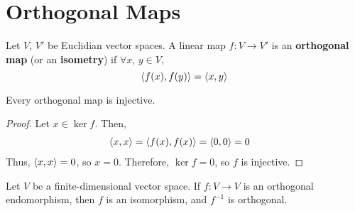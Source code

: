 \documentclass[letterpaper,12pt]{article}
\begin{document}
\section*{Orthogonal Maps}
\begin{definition}
Let $V$, $V'$ be Euclidian vector spaces. A linear map $f: V \rightarrow V'$ is an \textbf{orthogonal map} (or an \textbf{isometry}) if $\forall x$, $y \in V$,
\begin{equation*}
    \left< f(x), f(y) \right> = \left< x, y \right>
\end{equation*}
\end{definition}

\begin{corollary}
Every orthogonal map is injective.
\end{corollary}
\begin{proof}
Let $x \in \ker{f}$. Then,
\begin{align*}
    \left< x, x \right> = \left< f(x), f(x) \right> & = \left< 0, 0 \right> = 0
\end{align*}
Thus, $\left< x, x \right> = 0$, so $x = 0$. Therefore, $\ker{f} = 0$, so $f$ is injective.
\end{proof}

\begin{theorem}
Let $V$ be a finite-dimensional vector space. If $f: V \rightarrow V$ is an orthogonal endomorphism, then $f$ is an isomorphism, and $f^{-1}$ is orthogonal.
\end{theorem}
\end{document}
